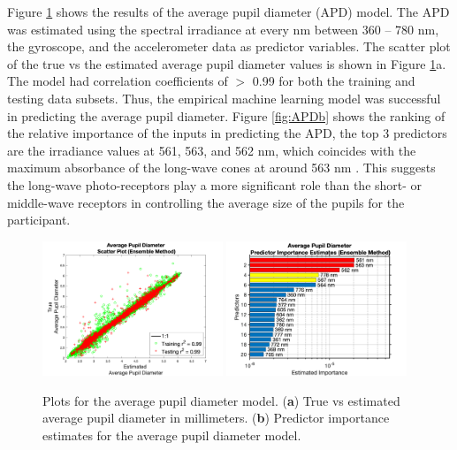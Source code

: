 \documentclass[10pt]{article}
\begin{document}
Figure \ref{fig:APD} shows the results of the average pupil diameter (APD) model. The APD was estimated using the spectral irradiance at every nm between 360 -- 780 nm, the gyroscope, and the accelerometer data as predictor variables. The scatter plot of the true vs the estimated average pupil diameter values is shown in Figure \ref{fig:APD}a. The model had correlation coefficients of $>$ 0.99 for both the training and testing data subsets. Thus, the empirical machine learning model was successful in predicting the average pupil diameter. Figure \ref{fig:APDb} shows the ranking of the relative importance of the inputs in predicting the APD, the top 3 predictors are the irradiance values at 561, 563, and 562 nm, which coincides with the maximum absorbance of the long-wave cones at around 563 nm \cite{BowmakerCones}. This suggests the long-wave photo-receptors play a more significant role than the short- or middle-wave receptors in controlling the average size of the pupils for the participant.

\begin{figure}[!b]
  \centering
  \includegraphics[width=0.48\textwidth]{./scatterPlots/AveragePupilDiameter_Ensemble_Scatter2.png}\label{fig:APDa}
  \hfill
  \includegraphics[width=0.48\textwidth]{./importanceRankings/AveragePupilDiameterEnsembleImpRankT20.png}\label{fig:APDb}
  \caption{Plots for the average pupil diameter model. (\textbf{a}) True vs estimated average pupil diameter in millimeters. (\textbf{b}) Predictor importance estimates for the average pupil diameter model.
  }
  \label{fig:APD}
\end{figure}
\end{document}
